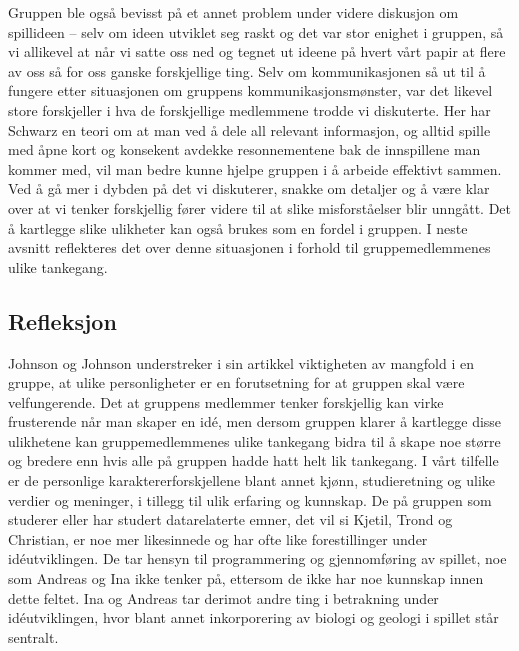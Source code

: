	Gruppen ble også bevisst på et annet problem under videre diskusjon om spillideen – selv om ideen utviklet seg raskt og det var stor enighet i gruppen, så vi allikevel at når vi satte oss ned og tegnet ut ideene på hvert vårt papir at flere av oss så for oss ganske forskjellige ting. Selv om kommunikasjonen så ut til å fungere etter situasjonen om gruppens kommunikasjonsmønster, var det likevel store forskjeller i hva de forskjellige medlemmene trodde vi diskuterte. Her har Schwarz en teori om at man ved å dele all relevant informasjon, og alltid spille med åpne kort og konsekent avdekke resonnementene bak de innspillene man kommer med, vil man bedre kunne hjelpe gruppen i å arbeide effektivt sammen. Ved å gå mer i dybden på det vi diskuterer, snakke om detaljer og å være klar over at vi tenker forskjellig fører videre til at slike misforståelser blir unngått. Det å kartlegge slike ulikheter kan også brukes som en fordel i gruppen. I neste avsnitt reflekteres det over denne situasjonen i forhold til gruppemedlemmenes ulike tankegang.

	\subsection{Refleksjon} %
	Johnson og Johnson \cite{Johnson} understreker i sin artikkel viktigheten av mangfold i en gruppe, at ulike personligheter er en forutsetning for at gruppen skal være velfungerende. Det at gruppens medlemmer tenker forskjellig kan virke frusterende når man skaper en idé, men dersom gruppen klarer å kartlegge disse ulikhetene kan gruppemedlemmenes ulike tankegang bidra til å skape noe større og bredere enn hvis alle på gruppen hadde hatt helt lik tankegang. I vårt tilfelle er de personlige karaktererforskjellene blant annet kjønn, studieretning og ulike verdier og meninger, i tillegg til ulik erfaring og kunnskap. De på gruppen som studerer eller har studert datarelaterte emner, det vil si Kjetil, Trond og Christian, er noe mer likesinnede og har ofte like forestillinger under idéutviklingen. De tar hensyn til programmering og gjennomføring av spillet, noe som Andreas og Ina ikke tenker på, ettersom de ikke har noe kunnskap innen dette feltet. Ina og Andreas tar derimot andre ting i betrakning under idéutviklingen, hvor blant annet inkorporering av biologi og geologi i spillet står sentralt.

